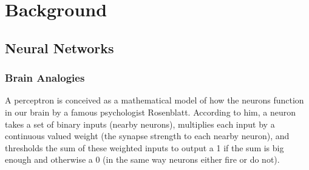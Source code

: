 

\chapter{Background}

\ifpdf
    \graphicspath{{Chapter2/Figs/Raster/}{Chapter2/Figs/PDF/}{Chapter2/Figs/}}
\else
    \graphicspath{{Chapter2/Figs/Vector/}{Chapter2/Figs/}}
\fi



\pagebreak

\section{Neural Networks}
\subsection{Brain Analogies}

A perceptron is conceived as a mathematical model of how the neurons function in our brain by a famous psychologist Rosenblatt. According to him, a neuron  takes a set of binary inputs (nearby neurons), multiplies each input by a continuous valued weight (the synapse strength to each nearby neuron), and thresholds the sum of these weighted inputs to output a 1 if the sum is big enough and otherwise a 0 (in the same way neurons either fire or do not).

